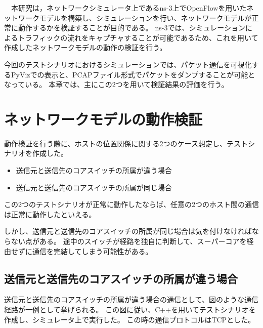\begin{comment}
\end{comment}

　本研究は，ネットワークシミュレータ上であるns-3上でOpenFlowを用いたネットワークモデルを構築し、シミュレーションを行い、ネットワークモデルが正常に動作するかを検証することが目的である。
ns-3では、シミュレーションによるトラフィックの流れをキャプチャすることが可能であるため、これを用いて作成したネットワークモデルの動作の検証を行う。

今回のテストシナリオにおけるシミュレーションでは、パケット通信を可視化するPyVizでの表示と、PCAPファイル形式でパケットをダンプすることが可能となっている。
本章では、主にこの2つを用いて検証結果の評価を行う。

\section{ネットワークモデルの動作検証}

動作検証を行う際に、ホストの位置関係に関する2つのケース想定し、テストシナリオを作成した。

\begin{itemize}
	\item 送信元と送信先のコアスイッチの所属が違う場合
	\item 送信元と送信先のコアスイッチの所属が同じ場合
\end{itemize}

この2つのテストシナリオが正常に動作したならば、任意の2つのホスト間の通信は正常に動作したといえる。

しかし、送信元と送信先のコアスイッチの所属が同じ場合は気を付けなければならない点がある。
途中のスイッチが経路を独自に判断して、スーパーコアを経由せずに通信を完結してしまう可能性がある。



\subsection{送信元と送信先のコアスイッチの所属が違う場合}

送信元と送信先のコアスイッチの所属が違う場合の通信として、図のような通信経路が一例として挙げられる。
この図に従い、C++を用いてテストシナリオを作成し、シミュレータ上で実行した。
この時の通信プロトコルはTCPとした。

